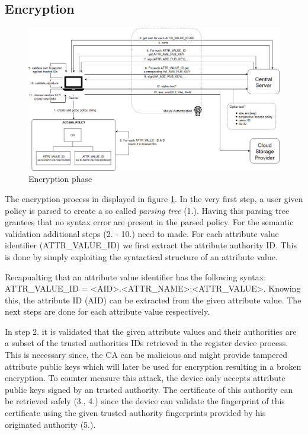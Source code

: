 
\subsection{Encryption}

\begin{figure}[!t]
\centering
    \includegraphics[width=1\linewidth]{img/encryption.png}
    \caption{Encryption phase}
    \label{fig:tfdacmacs-encrypt}
\end{figure}

The encryption process in displayed in figure \ref{fig:tfdacmacs-encrypt}. In the very first step, a user given policy is parsed to create a so called \textit{parsing tree} (1.). Having this parsing tree grantees that no syntax error are present in the parsed policy. For the semantic validation additional steps (2. - 10.) need to made. For each attribute value identifier (ATTR\_VALUE\_ID) we first extract the attribute authority ID. This is done by simply exploiting the syntactical structure of an attribute value. 

Recapualting that an attribute value identifier has the following syntax: \\ATTR\_VALUE\_ID = <AID>.<ATTR\_NAME>:<ATTR\_VALUE>. Knowing this, the attribute ID (AID) can be extracted from the given attribute value. The next steps are done for each attribute value respectively. 

In step 2. it is validated that the given attribute values and their authorities are a subset of the trusted authorities IDs retrieved in the register device process. This is necessary since, the CA can be malicious and might provide tampered attribute public keys which will later be used for encryption resulting in a broken encryption. To counter measure this attack, the device only accepts attribute public keys signed by an trusted authority. The certificate of this authority can be retrieved safely (3., 4.) since the device can validate the fingerprint of this certificate using the given trusted authority fingerprints provided by his originated authority (5.).  

